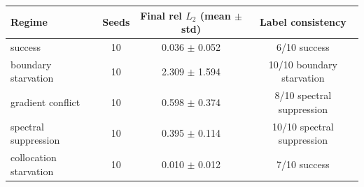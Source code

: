 \begin{tabular}{lccc}
\toprule
Regime & Seeds & Final rel $L_2$ (mean $\pm$ std) & Label consistency \\
\midrule
success & 10 & 0.036 $\pm$ 0.052 & 6/10 success \\
boundary starvation & 10 & 2.309 $\pm$ 1.594 & 10/10 boundary starvation \\
gradient conflict & 10 & 0.598 $\pm$ 0.374 & 8/10 spectral suppression \\
spectral suppression & 10 & 0.395 $\pm$ 0.114 & 10/10 spectral suppression \\
collocation starvation & 10 & 0.010 $\pm$ 0.012 & 7/10 success \\
\bottomrule
\end{tabular}
